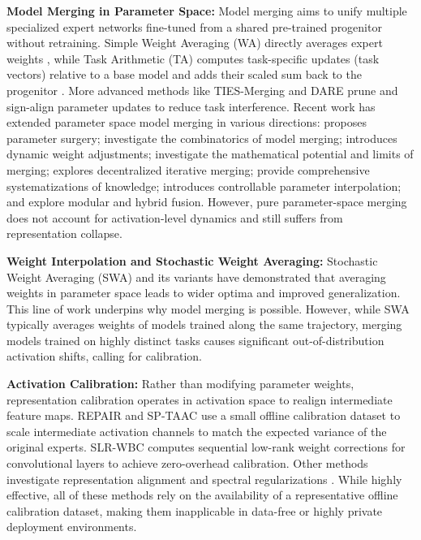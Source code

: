 \documentclass{article}
\theoremstyle{plain}
\theoremstyle{definition}
\theoremstyle{remark}
\begin{document}
\textbf{Model Merging in Parameter Space:} Model merging aims to unify multiple specialized expert networks fine-tuned from a shared pre-trained progenitor without retraining. Simple Weight Averaging (WA) directly averages expert weights \cite{wortsman2022model}, while Task Arithmetic (TA) computes task-specific updates (task vectors) relative to a base model and adds their scaled sum back to the progenitor \cite{ilharco2022editing}. More advanced methods like TIES-Merging \cite{yadav2023ties} and DARE \cite{yu2024language} prune and sign-align parameter updates to reduce task interference. Recent work has extended parameter space model merging in various directions: \cite{yang2024surgeryv} proposes parameter surgery; \cite{amine2019merging, slimi2024combinat, thakre2025hybrid} investigate the combinatorics of model merging; \cite{wang2024dynamic} introduces dynamic weight adjustments; \cite{lv2025potentia, lv2025deep, lv2023deepmerg} investigate the mathematical potential and limits of merging; \cite{saadati2024dimat} explores decentralized iterative merging; \cite{khan2024sok, sarkar2024enhancin, lee2025mitigati} provide comprehensive systematizations of knowledge; \cite{zhang2025control} introduces controllable parameter interpolation; and \cite{ladwig2023modular, afraji2025integrat, georgiadis2025building, ran2022improved} explore modular and hybrid fusion. However, pure parameter-space merging does not account for activation-level dynamics and still suffers from representation collapse.

\textbf{Weight Interpolation and Stochastic Weight Averaging:} Stochastic Weight Averaging (SWA) and its variants \cite{shin2020sqwa, athiwaratkun2018improvin, guo2022stochast, nam2022improvin, shen2023shortter, kaddour2022fair, maddox2019simple, seckler2022bayesian} have demonstrated that averaging weights in parameter space leads to wider optima and improved generalization. This line of work underpins why model merging is possible. However, while SWA typically averages weights of models trained along the same trajectory, merging models trained on highly distinct tasks causes significant out-of-distribution activation shifts, calling for calibration.

\textbf{Activation Calibration:} Rather than modifying parameter weights, representation calibration operates in activation space to realign intermediate feature maps. REPAIR \cite{jordan2023repair} and SP-TAAC \cite{sptaac2026} use a small offline calibration dataset to scale intermediate activation channels to match the expected variance of the original experts. SLR-WBC \cite{slrwbc2026} computes sequential low-rank weight corrections for convolutional layers to achieve zero-overhead calibration. Other methods investigate representation alignment and spectral regularizations \cite{wrsa2026, mspr2026}. While highly effective, all of these methods rely on the availability of a representative offline calibration dataset, making them inapplicable in data-free or highly private deployment environments.
\end{document}
